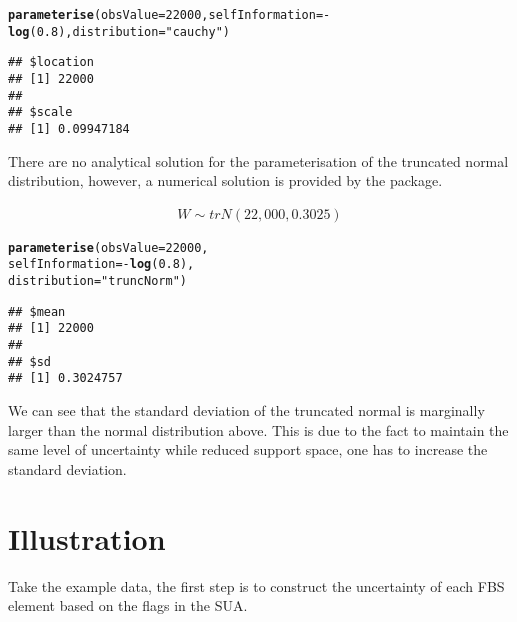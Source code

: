 \documentclass[nojss]{jss}\usepackage[]{graphicx}\usepackage[]{color}
\makeatletter
\newcommand{\hlnum}[1]{\textcolor[rgb]{0.686,0.059,0.569}{#1}}%
\newcommand{\hlstr}[1]{\textcolor[rgb]{0.192,0.494,0.8}{#1}}%
\newcommand{\hlopt}[1]{\textcolor[rgb]{0,0,0}{#1}}%
\newcommand{\hlstd}[1]{\textcolor[rgb]{0.345,0.345,0.345}{#1}}%
\newcommand{\hlkwc}[1]{\textcolor[rgb]{0.333,0.667,0.333}{#1}}%
\newcommand{\hlkwd}[1]{\textcolor[rgb]{0.737,0.353,0.396}{\textbf{#1}}}%
\newenvironment{kframe}{%
 \def\at@end@of@kframe{}%
 \ifinner\ifhmode%
  \def\at@end@of@kframe{\end{minipage}}%
  \begin{minipage}{\columnwidth}%
 \fi\fi%
 \def\FrameCommand##1{\hskip\@totalleftmargin \hskip-\fboxsep
 \colorbox{shadecolor}{##1}\hskip-\fboxsep
     \hskip-\linewidth \hskip-\@totalleftmargin \hskip\columnwidth}%
 \MakeFramed {\advance\hsize-\width
   \@totalleftmargin\z@ \linewidth\hsize
   \@setminipage}}%
 {\par\unskip\endMakeFramed%
 \at@end@of@kframe}
\newenvironment{knitrout}{}{} %
\makeatother
\begin{document}
\begin{knitrout}
\color{fgcolor}\begin{kframe}
\begin{alltt}
\hlkwd{parameterise}\hlstd{(}\hlkwc{obsValue} \hlstd{=} \hlnum{22000}\hlstd{,} \hlkwc{selfInformation} \hlstd{=} \hlopt{-}\hlkwd{log}\hlstd{(}\hlnum{0.8}\hlstd{),} \hlkwc{distribution} \hlstd{=} \hlstr{"cauchy"}\hlstd{)}
\end{alltt}
\begin{verbatim}
## $location
## [1] 22000
## 
## $scale
## [1] 0.09947184
\end{verbatim}
\end{kframe}
\end{knitrout}


There are no analytical solution for the parameterisation of the
truncated normal distribution, however, a numerical solution is
provided by the package.



\begin{align}
  W \sim trN(22,000, 0.3025)
\end{align}

\begin{knitrout}
\color{fgcolor}\begin{kframe}
\begin{alltt}
\hlkwd{parameterise}\hlstd{(}\hlkwc{obsValue} \hlstd{=} \hlnum{22000}\hlstd{,}
             \hlkwc{selfInformation} \hlstd{=} \hlopt{-}\hlkwd{log}\hlstd{(}\hlnum{0.8}\hlstd{),}
             \hlkwc{distribution} \hlstd{=} \hlstr{"truncNorm"}\hlstd{)}
\end{alltt}
\begin{verbatim}
## $mean
## [1] 22000
## 
## $sd
## [1] 0.3024757
\end{verbatim}
\end{kframe}
\end{knitrout}


We can see that the standard deviation of the truncated normal is
marginally larger than the normal distribution above. This is due to
the fact to maintain the same level of uncertainty while reduced
support space, one has to increase the standard deviation.
  
  


\section{Illustration}
Take the example data, the first step is to construct the uncertainty
of each FBS element based on the flags in the SUA.
\end{document}

